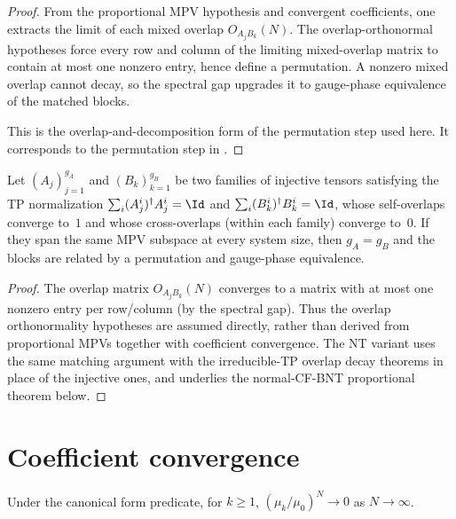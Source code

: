 \begin{proof}
	\leanok
	From the proportional MPV hypothesis and convergent
	coefficients, one extracts the limit of each mixed overlap
	$O_{A_j B_k}(N)$.
	The overlap-orthonormal hypotheses force every row and column of the
	limiting mixed-overlap matrix to contain at most one nonzero entry,
	hence define a permutation.
	A nonzero mixed overlap cannot decay, so the spectral gap upgrades it
	to gauge-phase equivalence of the matched blocks.

	This is the overlap-and-decomposition form of the permutation step used here.
	It corresponds to the permutation step in
	\cite[Theorem~4.1]{Cirac2021Matrix}.
\end{proof}

\begin{theorem}\label{thm:bnt_perm_simple}
	\leanok
	Let $(A_j)_{j=1}^{g_A}$ and $(B_k)_{k=1}^{g_B}$ be two
	families of injective tensors satisfying the TP normalization
	$\sum_i (A_j^i)^\dagger A_j^i = \Id$ and
	$\sum_i (B_k^i)^\dagger B_k^i = \Id$, whose self-overlaps
	converge to~$1$ and whose cross-overlaps (within each
	family) converge to~$0$.
	If they span the same MPV subspace at every system size,
	then $g_A = g_B$ and the blocks are related by a
	permutation and gauge-phase equivalence.
\end{theorem}

\begin{proof}\leanok{}
		The overlap matrix $O_{A_j B_k}(N)$ converges to a
		matrix with at most one nonzero entry per row/column
		(by the spectral gap).
		Thus the overlap orthonormality hypotheses are
		assumed directly, rather than derived from
		proportional MPVs together with coefficient convergence.
		The NT variant uses the same matching argument with the
		irreducible-TP overlap decay theorems in place of the injective ones,
		and underlies the normal-CF-BNT proportional theorem below.
\end{proof}

\section{Coefficient convergence}

\begin{theorem}\label{thm:coeff_ratio_decay}
	\leanok
	Under the canonical form predicate, for $k \ge 1$,
	$(\mu_k / \mu_0)^N \to 0$
	as $N \to \infty$.
\end{theorem}

